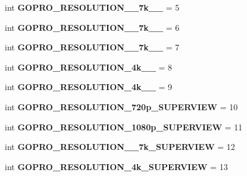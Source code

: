 \begin{DoxyCompactItemize}
int {\bfseries G\+O\+P\+R\+O\+\_\+\+R\+E\+S\+O\+L\+U\+T\+I\+O\+N\+\_\+\_\+7k\+\_\+\_} = 5
\item 
\mbox{\label{namespacepymavlink_1_1dialects_1_1v10_a0792b8df8beba5cc12468c724866f908}} 
int {\bfseries G\+O\+P\+R\+O\+\_\+\+R\+E\+S\+O\+L\+U\+T\+I\+O\+N\+\_\+\_\+7k\+\_\+\_} = 6
\item 
\mbox{\label{namespacepymavlink_1_1dialects_1_1v10_a3373ed75707ed664d545ea7536da70c9}} 
int {\bfseries G\+O\+P\+R\+O\+\_\+\+R\+E\+S\+O\+L\+U\+T\+I\+O\+N\+\_\+\_\+7k\+\_\+\_} = 7
\item 
\mbox{\label{namespacepymavlink_1_1dialects_1_1v10_a3bff566c2ed14c7e4fa52ab3d41cb018}} 
int {\bfseries G\+O\+P\+R\+O\+\_\+\+R\+E\+S\+O\+L\+U\+T\+I\+O\+N\+\_\+4k\+\_\+\_} = 8
\item 
\mbox{\label{namespacepymavlink_1_1dialects_1_1v10_ac620d34bab56b5a5e132733d28bc378c}} 
int {\bfseries G\+O\+P\+R\+O\+\_\+\+R\+E\+S\+O\+L\+U\+T\+I\+O\+N\+\_\+4k\+\_\+\_} = 9
\item 
\mbox{\label{namespacepymavlink_1_1dialects_1_1v10_aa820b78b92a0bbb42a4fd701a94b260a}} 
int {\bfseries G\+O\+P\+R\+O\+\_\+\+R\+E\+S\+O\+L\+U\+T\+I\+O\+N\+\_\+720p\+\_\+\+S\+U\+P\+E\+R\+V\+I\+EW} = 10
\item 
\mbox{\label{namespacepymavlink_1_1dialects_1_1v10_a796858e75780ada87665083a406e5a54}} 
int {\bfseries G\+O\+P\+R\+O\+\_\+\+R\+E\+S\+O\+L\+U\+T\+I\+O\+N\+\_\+1080p\+\_\+\+S\+U\+P\+E\+R\+V\+I\+EW} = 11
\item 
\mbox{\label{namespacepymavlink_1_1dialects_1_1v10_a5ff081a4f27053814effcc5d1bc05f39}} 
int {\bfseries G\+O\+P\+R\+O\+\_\+\+R\+E\+S\+O\+L\+U\+T\+I\+O\+N\+\_\+\_\+7k\+\_\+\+S\+U\+P\+E\+R\+V\+I\+EW} = 12
\item 
\mbox{\label{namespacepymavlink_1_1dialects_1_1v10_aa990aca71fb969c554176a2618ad711f}} 
int {\bfseries G\+O\+P\+R\+O\+\_\+\+R\+E\+S\+O\+L\+U\+T\+I\+O\+N\+\_\+4k\+\_\+\+S\+U\+P\+E\+R\+V\+I\+EW} = 13

\end{DoxyCompactItemize}
